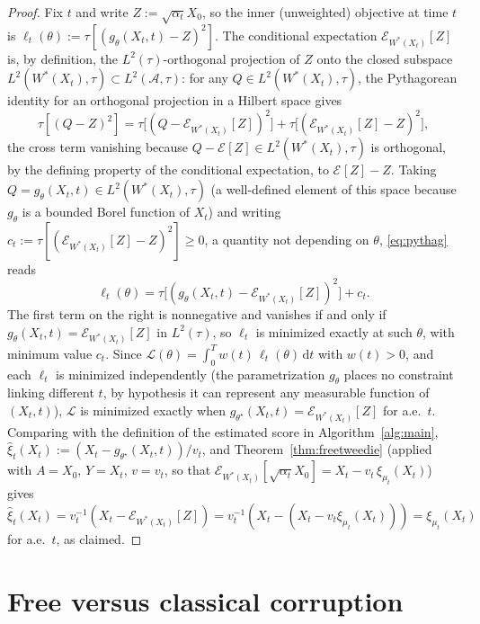 \documentclass[11pt]{article}
\newcommand{\A}{\mathcal{A}}
\newcommand{\dd}{\mathrm{d}}
\newcommand{\Econd}[1]{\mathcal{E}_{#1}}
\theoremstyle{plain}
\theoremstyle{definition}
\theoremstyle{remark}
\begin{document}
\begin{proof}
Fix $t$ and write $Z:=\sqrt{\alpha_t}X_0$, so the inner (unweighted) objective at time
$t$ is $\ell_t(\theta):=\tau[(g_\theta(X_t,t)-Z)^2]$. The conditional expectation
$\Econd{W^*(X_t)}[Z]$ is, by definition, the $L^2(\tau)$-orthogonal projection of $Z$
onto the closed subspace $L^2(W^*(X_t),\tau)\subset L^2(\A,\tau)$: for any
$Q\in L^2(W^*(X_t),\tau)$, the Pythagorean identity for an orthogonal projection in a
Hilbert space gives
\begin{equation}\label{eq:pythag}
  \tau[(Q-Z)^2] = \tau\big[(Q-\Econd{W^*(X_t)}[Z])^2\big] + \tau\big[(\Econd{W^*(X_t)}[Z]-Z)^2\big],
\end{equation}
the cross term vanishing because $Q-\Econd{}[Z]\in L^2(W^*(X_t),\tau)$ is orthogonal,
by the defining property of the conditional expectation, to $\Econd{}[Z]-Z$. Taking
$Q=g_\theta(X_t,t)\in L^2(W^*(X_t),\tau)$ (a well-defined element of this space
because $g_\theta$ is a bounded Borel function of $X_t$) and writing
$c_t:=\tau[(\Econd{W^*(X_t)}[Z]-Z)^2]\ge0$, a quantity not depending on $\theta$,
\eqref{eq:pythag} reads
\[
  \ell_t(\theta) = \tau\big[(g_\theta(X_t,t)-\Econd{W^*(X_t)}[Z])^2\big] + c_t.
\]
The first term on the right is nonnegative and vanishes if and only if
$g_\theta(X_t,t)=\Econd{W^*(X_t)}[Z]$ in $L^2(\tau)$, so $\ell_t$ is minimized exactly
at such $\theta$, with minimum value $c_t$. Since $\mathcal L(\theta)=\int_0^Tw(t)\,
\ell_t(\theta)\,\dd t$ with $w(t)>0$, and each $\ell_t$ is minimized independently
(the parametrization $g_\theta$ places no constraint linking different $t$, by
hypothesis it can represent any measurable function of $(X_t,t)$), $\mathcal L$ is
minimized exactly when $g_{\theta^\star}(X_t,t)=\Econd{W^*(X_t)}[Z]$ for a.e.\ $t$.
Comparing with the definition of the estimated score in Algorithm~\ref{alg:main},
$\widehat\xi_t(X_t):=(X_t-g_{\theta^\star}(X_t,t))/v_t$, and
Theorem~\ref{thm:freetweedie} (applied with
$A=X_0$, $Y=X_t$, $v=v_t$, so that $\Econd{W^*(X_t)}[\sqrt{\alpha_t}X_0]=
X_t-v_t\,\xi_{\mu_t}(X_t)$) gives $\widehat\xi_t(X_t)=v_t^{-1}(X_t-
\Econd{W^*(X_t)}[Z])=v_t^{-1}(X_t-(X_t-v_t\xi_{\mu_t}(X_t)))=\xi_{\mu_t}(X_t)$ for
a.e.\ $t$, as claimed.
\end{proof}

\section{Free versus classical corruption}\label{app:freevsclassical}
\end{document}
